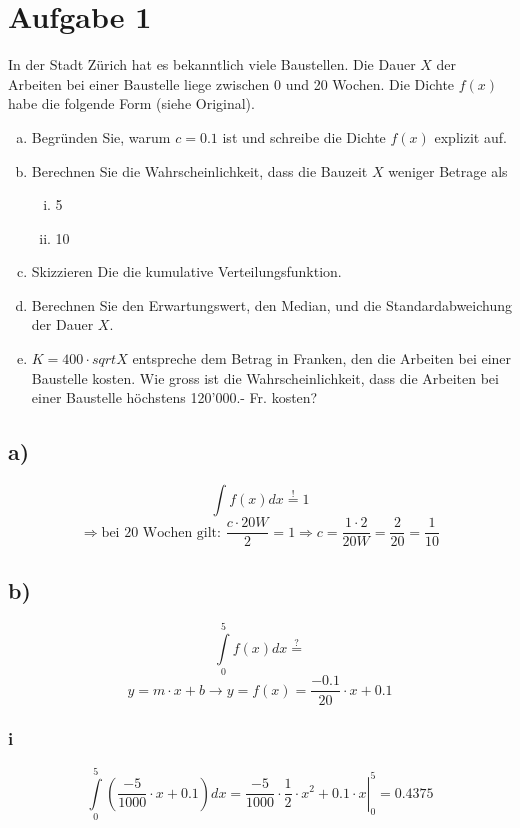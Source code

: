\section{Aufgabe 1}

In der Stadt Zürich hat es bekanntlich viele Baustellen. Die Dauer $X$ der
Arbeiten bei einer Baustelle liege zwischen 0 und 20 Wochen. 
Die Dichte $f(x)$ habe die folgende Form (siehe Original).

\begin{enumerate}[(a)]
	\item Begründen Sie, warum $c=0.1$ ist und schreibe die Dichte 
          $f(x)$ explizit auf.
    \item Berechnen Sie die Wahrscheinlichkeit, dass die Bauzeit $X$
          weniger Betrage als 
          \begin{enumerate}[(i)]
              \item 5
              \item 10
          \end {enumerate}
    \item Skizzieren Die die kumulative Verteilungsfunktion.
    \item Berechnen Sie den Erwartungswert, den Median, und die
          Standardabweichung der Dauer $X$.
    \item $K=400 \cdot sqrt{X} $ entspreche dem Betrag in Franken, den die
          Arbeiten bei einer Baustelle kosten. Wie gross ist die 
          Wahrscheinlichkeit, dass die Arbeiten bei einer Baustelle
          höchstens 120'000.- Fr. kosten?
\end{enumerate}

\subsection*{a)}
\[ \int f(x) dx \stackrel{!}{=} 1 \] 
\[ \Rightarrow \text{bei 20 Wochen gilt: } 
   \frac{c\cdot20W}{2} = 1 \Rightarrow 
   c=\frac{1\cdot2}{20W} = \frac{2}{20} = \frac{1}{10} \]

\subsection*{b)}
\[ \int\limits_0^5 f(x) dx \stackrel{?}{=} \]
\[ y = m\cdot x + b \rightarrow y=f(x)=\frac{-0.1}{20}\cdot x + 0.1 \]
\subsubsection*{i}
\[ \int\limits_0^5\left( \frac{-5}{1000} \cdot x + 0.1 \right)dx =
   \left. 
   	\frac{-5}{1000} \cdot \frac{1}{2} \cdot x^2 + 0.1 \cdot x 
   \right|_0^5 = 0.4375 \]

